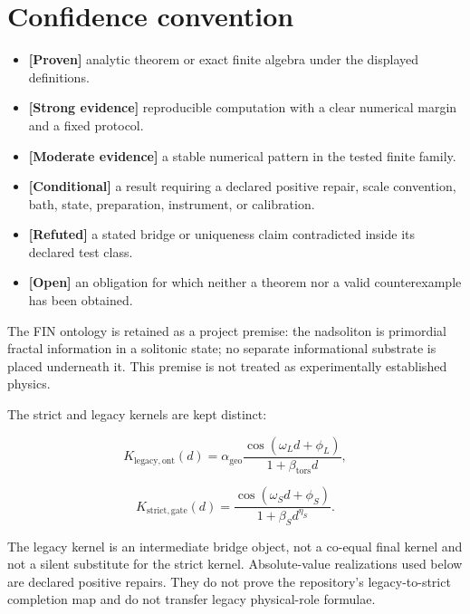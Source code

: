 \documentclass[11pt,a4paper,openany]{report}
\newcommand{\statusProven}{\textcolor{fingreen}{[Proven]}}
\newcommand{\statusStrong}{\textcolor{finblue}{[Strong evidence]}}
\newcommand{\statusModerate}{\textcolor{finviolet}{[Moderate evidence]}}
\newcommand{\statusConditional}{\textcolor{finorange}{[Conditional]}}
\newcommand{\statusRefuted}{\textcolor{finred}{[Refuted]}}
\newcommand{\statusOpen}{\textcolor{finviolet}{[Open]}}
\begin{document}
\tableofcontents
\clearpage
{}

\section{Confidence convention}

\begin{itemize}
\item 
\textbf{\statusProven{}} analytic theorem or exact finite algebra under the displayed definitions.

\item 
\textbf{\statusStrong{}} reproducible computation with a clear numerical margin and a fixed protocol.

\item 
\textbf{\statusModerate{}} a stable numerical pattern in the tested finite family.

\item 
\textbf{\statusConditional{}} a result requiring a declared positive repair, scale convention, bath, state, preparation, instrument, or calibration.

\item 
\textbf{\statusRefuted{}} a stated bridge or uniqueness claim contradicted inside its declared test class.

\item 
\textbf{\statusOpen{}} an obligation for which neither a theorem nor a valid counterexample has been obtained.

\end{itemize}

The FIN ontology is retained as a project premise: the nadsoliton is primordial fractal information in a solitonic state; no separate informational substrate is placed underneath it. This premise is not treated as experimentally established physics.

The strict and legacy kernels are kept distinct:

\[
K_{\mathrm{legacy,ont}}(d)
=
\alpha_{\mathrm{geo}}
\frac{\cos(\omega_Ld+\phi_L)}{1+\beta_{\mathrm{tors}}d},
\]

\[
K_{\mathrm{strict,gate}}(d)
=
\frac{\cos(\omega_Sd+\phi_S)}{1+\beta_Sd^{\eta_S}}.
\]

The legacy kernel is an intermediate bridge object, not a co-equal final kernel and not a silent substitute for the strict kernel. Absolute-value realizations used below are declared positive repairs. They do not prove the repository's legacy-to-strict completion map and do not transfer legacy physical-role formulae.
\end{document}
